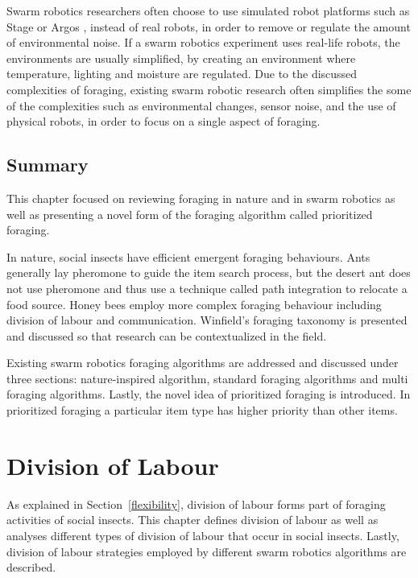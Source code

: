 Swarm robotics researchers often choose to use simulated robot platforms such as Stage \cite{vaughan2008massively} or Argos \cite{pinciroli2011argos}, instead of real robots, in order to remove or regulate the amount of environmental noise. If a swarm robotics experiment uses real-life robots, the environments are usually simplified, by creating an environment where temperature, lighting and moisture are regulated\cite{labella2006division,nouyan2006group}. Due to the discussed complexities of foraging, existing swarm robotic research often simplifies the some of the complexities such as environmental changes, sensor noise, and the use of physical robots, in order to focus on a single aspect of foraging. 

\section{Summary}
\label{foraging:summary}

This chapter focused on reviewing foraging in nature and in swarm robotics as well as presenting a novel form of the foraging algorithm called prioritized foraging. 

In nature, social insects have efficient emergent foraging behaviours. Ants generally lay pheromone to guide the item search process, but the desert ant does not use pheromone and thus use a technique called path integration to relocate a food source. Honey bees employ more complex foraging behaviour including division of labour and communication. Winfield's foraging taxonomy is presented and discussed so that research can be contextualized in the field. 

Existing swarm robotics foraging algorithms are addressed and discussed under three sections: nature-inspired algorithm, standard foraging algorithms and multi foraging algorithms. Lastly, the novel idea of prioritized foraging is introduced. In prioritized foraging a particular item type has higher priority than other items. 

\chapter{Division of Labour}
\label{chap:divisionoflabour}


As explained in Section~\ref{flexibility}, division of labour forms part of foraging activities of social insects. This chapter defines division of labour as well as analyses different types of division of labour that occur in social insects. Lastly, division of labour strategies employed by different swarm robotics algorithms are described. 

